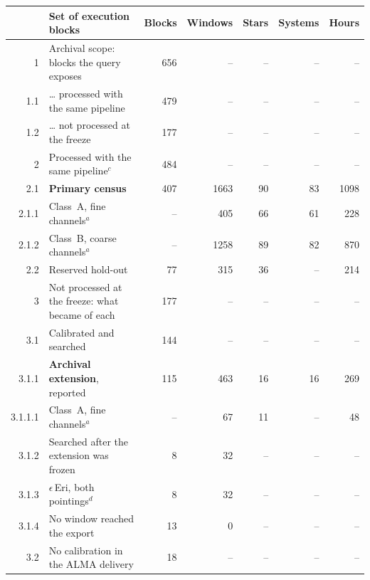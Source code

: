 \begin{tabular}{@{}r@{~}p{}rrrrr@{}}
\hline
 & Set of execution blocks & Blocks & Windows & Stars & Systems & Hours \\
\hline
1 & Archival scope: blocks the query exposes & 656 & -- & -- & -- & -- \\
1.1 & \hspace{0.8em}\ldots{} processed with the same pipeline & 479 & -- & -- & -- & -- \\
1.2 & \hspace{0.8em}\ldots{} not processed at the freeze & 177 & -- & -- & -- & -- \\
\hline
2 & Processed with the same pipeline$^{c}$ & 484 & -- & -- & -- & -- \\
2.1 & \hspace{0.8em}\textbf{Primary census} & 407 & 1663 & 90 & 83 & 1098 \\
2.1.1 & \hspace{1.6em}Class~A, fine channels$^{a}$ & -- & 405 & 66 & 61 & 228 \\
2.1.2 & \hspace{1.6em}Class~B, coarse channels$^{a}$ & -- & 1258 & 89 & 82 & 870 \\
2.2 & \hspace{0.8em}Reserved hold-out & 77 & 315 & 36 & -- & 214 \\
\hline
3 & Not processed at the freeze: what became of each & 177 & -- & -- & -- & -- \\
3.1 & \hspace{0.8em}Calibrated and searched & 144 & -- & -- & -- & -- \\
3.1.1 & \hspace{1.6em}\textbf{Archival extension}, reported & 115 & 463 & 16 & 16 & 269 \\
3.1.1.1 & \hspace{2.4em}Class~A, fine channels$^{a}$ & -- & 67 & 11 & -- & 48 \\
3.1.2 & \hspace{1.6em}Searched after the extension was frozen & 8 & 32 & -- & -- & -- \\
3.1.3 & \hspace{1.6em}$\epsilon$\,Eri, both pointings$^{d}$ & 8 & 32 & -- & -- & -- \\
3.1.4 & \hspace{1.6em}No window reached the export & 13 & 0 & -- & -- & -- \\
3.2 & \hspace{0.8em}No calibration in the ALMA delivery & 18 & -- & -- & -- & -- \\

\end{tabular}
